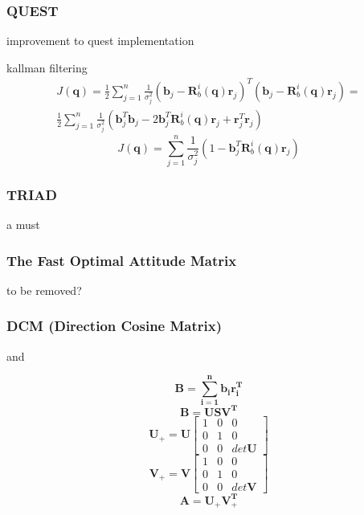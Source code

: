 \documentclass[12pt,a4paper,oneside]{article}
\begin{document}
\subsubsection{QUEST}
improvement to quest implementation \citet{RIS_1} \par
kallman filtering \citet{shuster1990kalman}
\begin{equation}
\begin{split}
J(\bm{q}) = \frac{1}{2}\sum_{j=1}^n\frac{1}{\sigma_j^2}(\bm{b}_j - \bm{R}_b^i(\bm{q})\bm{r}_j)^T(\bm{b}_j - \bm{R}_b^i(\bm{q})\bm{r}_j) = \\
\frac{1}{2}\sum_{j=1}^n\frac{1}{\sigma_j^2}(\bm{b}_j^T\bm{b}_j - 2\bm{b}_j^T\bm{R}_b^i(\bm{q})\bm{r}_j + \bm{r}_j^T\bm{r}_j)
\end{split}
\end{equation}
\begin{equation}
J(\bm{q}) = \sum_{j=1}^n\frac{1}{\sigma_j^2}(1 - \bm{b}_j^T\bm{R}_b^i(\bm{q})\bm{r}_j)
\end{equation}
\subsubsection{TRIAD}
a must
\subsubsection{The Fast Optimal Attitude Matrix}
to be removed?
\subsubsection{DCM (Direction Cosine Matrix)}
\citet{juang2003efficient}
 and

\citet{6187242}
\begin{equation}
\bm{B = \sum_{i=1}^nb_ir_i^T}
\end{equation}
\begin{equation}
\bm{B = USV^T}
\end{equation}
\begin{equation}
\bm{U}_+ = \bm{U}\begin{bmatrix}
1 & 0 & 0 \\
0 & 1 & 0 \\
0 & 0 & det\bm{U}
\end{bmatrix}
\end{equation}
\begin{equation}
\bm{V}_+ = \bm{V}\begin{bmatrix}
1 & 0 & 0 \\
0 & 1 & 0 \\
0 & 0 & det\bm{V}
\end{bmatrix}
\end{equation}
\begin{equation}
\bm{A = U_+V_+^T}
\end{equation}
\newpage
\end{document}
